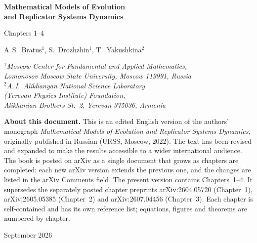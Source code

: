 \documentclass[12pt]{report}
\theoremstyle{definition}
\theoremstyle{remark}
\begin{document}
\begin{titlepage}
\centering
\vspace*{2.5cm}
{\LARGE\bfseries Mathematical Models of Evolution\\[6pt]
  and Replicator Systems Dynamics\par}
\vspace{1.2cm}
{\large Chapters 1--4\par}
\vspace{2cm}
{\large A.\,S.~Bratus$^{1}$, \quad S.~Drozhzhin$^{1}$, \quad T.~Yakushkina$^{2}$\par}
\vspace{0.8cm}
{\itshape
  $^{1}$Moscow Center for Fundamental and Applied Mathematics,\\
  Lomonosov Moscow State University, Moscow 119991, Russia\\[4pt]
  $^{2}$A.\,I.~Alikhanyan National Science Laboratory\\
  (Yerevan Physics Institute) Foundation,\\
  Alikhanian Brothers St.~2, Yerevan 375036, Armenia\par}
\vfill
\begin{minipage}{0.88\textwidth}\small
\noindent\textbf{About this document.}
This is an edited English version of the authors' monograph
\textit{Mathematical Models of Evolution and Replicator Systems Dynamics},
originally published in Russian (URSS, Moscow, 2022). The text has been
revised and expanded to make the results accessible to a wider international
audience. The book is posted on arXiv as a single document that grows as
chapters are completed: each new arXiv version extends the previous one, and
the changes are listed in the arXiv Comments field. The present version
contains Chapters~1--4. It supersedes the separately posted chapter preprints
arXiv:2604.05720 (Chapter~1), arXiv:2605.05385 (Chapter~2) and
arXiv:2607.04456 (Chapter~3). Each chapter is self-contained and has its own
reference list; equations, figures and theorems are numbered by chapter.
\end{minipage}\par
\vspace{1.5cm}
{\normalsize September 2026\par}
\end{titlepage}

\tableofcontents
\clearpage
\end{document}
